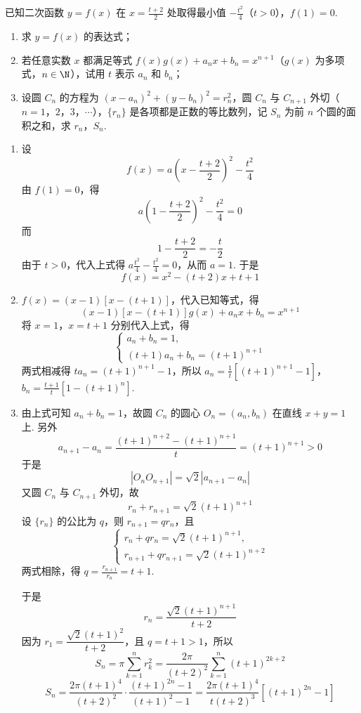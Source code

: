 \documentclass[UTF8,a4paper,oneside,11pt]{ctexbook}
\begin{document}
\begin{problem}
已知二次函数 \(y=f(x)\) 在 \(x=\frac{t+2}{2}\) 处取得最小值 \(-\frac{t^2}{4}\)（\(t>0\)），\(f(1)=0\).

\begin{enumerate}
\item 求 \(y=f(x)\) 的表达式；
\item 若任意实数 \(x\) 都满足等式 \(f(x)g(x)+a_nx+b_n=x^{n+1}\)（\(g(x)\) 为多项式，\(n\in\N\)），试用 \(t\) 表示 \(a_n\) 和 \(b_n\)；
\item 设圆 \(C_n\) 的方程为 \((x-a_n)^2+(y-b_n)^2=r_n^2\)，圆 \(C_n\) 与 \(C_{n+1}\) 外切（\(n=1\)，\(2\)，\(3\)，\(\cdots\)），\(\{r_n\}\) 是各项都是正数的等比数列，记 \(S_n\) 为前 \(n\) 个圆的面积之和，求 \(r_n\)，\(S_n\).
\end{enumerate}
\end{problem}

\begin{solution}
\begin{enumerate}
\item 设
\[
f(x)=a\left(x-\frac{t+2}{2}\right)^2-\frac{t^2}{4}
\]
由 \(f(1)=0\)，得
\[
a\left(1-\frac{t+2}{2}\right)^2-\frac{t^2}{4}=0
\]
而
\[
1-\frac{t+2}{2}=-\frac t2
\]
由于 \(t>0\)，代入上式得 \(a\frac{t^2}{4}-\frac{t^2}{4}=0\)，从而 \(a=1\). 于是
\[
f(x)=x^2-(t+2)x+t+1
\]

\item \(f(x)=(x-1)[x-(t+1)]\)，代入已知等式，得
\[
(x-1)[x-(t+1)]g(x)+a_nx+b_n=x^{n+1}
\]
将 \(x=1\)，\(x=t+1\) 分别代入上式，得
\[
\begin{cases}
a_n+b_n=1,\\
(t+1)a_n+b_n=(t+1)^{n+1}
\end{cases}
\]
两式相减得 \(ta_n=(t+1)^{n+1}-1\)，所以
\(a_n=\frac{1}{t}\left[(t+1)^{n+1}-1\right]\)，\(b_n=\frac{t+1}{t}\left[1-(t+1)^n\right]\).

\item 由上式可知 \(a_n+b_n=1\)，故圆 \(C_n\) 的圆心 \(O_n=(a_n,b_n)\) 在直线 \(x+y=1\) 上. 另外
\[
a_{n+1}-a_n=\frac{(t+1)^{n+2}-(t+1)^{n+1}}{t}=(t+1)^{n+1}>0
\]
于是
\[
|O_nO_{n+1}|=\sqrt{2}|a_{n+1}-a_n|
\]
又圆 \(C_n\) 与 \(C_{n+1}\) 外切，故
\[
r_n+r_{n+1}=\sqrt{2}(t+1)^{n+1}
\]
设 \(\{r_n\}\) 的公比为 \(q\)，则 \(r_{n+1}=qr_n\)，且
\[
\begin{cases}
r_n+qr_n=\sqrt{2}(t+1)^{n+1},\\
r_{n+1}+qr_{n+1}=\sqrt{2}(t+1)^{n+2}
\end{cases}
\]
两式相除，得 \(q=\frac{r_{n+1}}{r_n}=t+1\).

于是
\[
r_n=\frac{\sqrt{2}(t+1)^{n+1}}{t+2}
\]
因为 \(r_1=\dfrac{\sqrt{2}(t+1)^2}{t+2}\)，且 \(q=t+1>1\)，所以
\[
S_n=\pi\sum_{k=1}^n r_k^2
=\frac{2\pi}{(t+2)^2}\sum_{k=1}^n(t+1)^{2k+2}
\]
\[
S_n=\frac{2\pi(t+1)^4}{(t+2)^2}\cdot\frac{(t+1)^{2n}-1}{(t+1)^2-1}
=\frac{2\pi(t+1)^4}{t(t+2)^3}\left[(t+1)^{2n}-1\right]
\]
\end{enumerate}
\end{solution}

\end{document}
